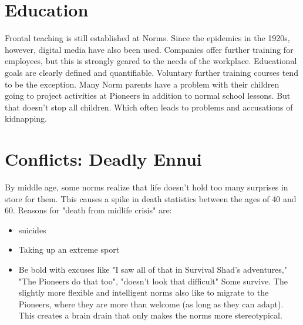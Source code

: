 \section{Education}
Frontal teaching is still established at Norms. Since the epidemics in the 1920s, however, digital media have also been used. Companies offer further training for employees, but this is strongly geared to the needs of the workplace.
Educational goals are clearly defined and quantifiable. Voluntary further training courses tend to be the exception. Many Norm parents have a problem with their children going to project activities at Pioneers in addition to normal school lessons. But that doesn't stop all children. Which often leads to problems and accusations of kidnapping.

\section{Conflicts: Deadly Ennui}
By middle age, some norms realize that life doesn't hold too many surprises in store for them.
This causes a spike in death statistics between the ages of 40 and 60. Reasons for "death from midlife crisis" are:
\begin{itemize}
    \item suicides
    \item Taking up an extreme sport
    \item Be bold with excuses like "I saw all of that in Survival Shad's adventures," "The Pioneers do that too", "doesn't look that difficult" Some survive. The slightly more flexible and intelligent norms also like to migrate to the Pioneers, where they are more than welcome (as long as they can adapt). This creates a brain drain that only makes the norms more stereotypical.
\end{itemize}

